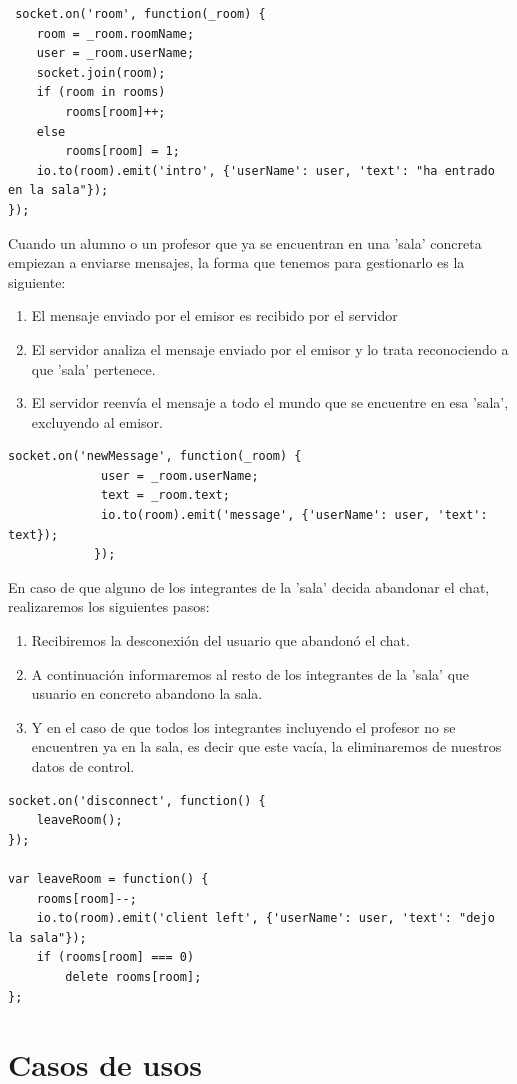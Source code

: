 \begin{itemize}
\begin{lstlisting}
 socket.on('room', function(_room) {
    room = _room.roomName;
	user = _room.userName;
    socket.join(room);
    if (room in rooms)
        rooms[room]++;
    else
        rooms[room] = 1;
    io.to(room).emit('intro', {'userName': user, 'text': "ha entrado en la sala"});
});

\end{lstlisting}

Cuando un alumno o un profesor que ya se encuentran en una 'sala' concreta empiezan a enviarse mensajes, la forma que tenemos para gestionarlo es la siguiente:

\begin{enumerate}
    \item El mensaje enviado por el emisor es recibido por el servidor

    \item El servidor analiza el mensaje enviado por el emisor y lo trata reconociendo a que 'sala' pertenece.

    \item El servidor reenvía el mensaje a todo el mundo que se encuentre en esa 'sala', excluyendo al emisor.
\end{enumerate}

\begin{lstlisting}
socket.on('newMessage', function(_room) {
			 user = _room.userName;
			 text = _room.text;
			 io.to(room).emit('message', {'userName': user, 'text': text});
			});
\end{lstlisting}

En caso de que alguno de los integrantes de la 'sala' decida abandonar el chat, realizaremos los siguientes pasos:

\begin{enumerate}
    \item Recibiremos la desconexión del usuario que abandonó el chat.

    \item A continuación informaremos al resto de los integrantes de la 'sala' que usuario en concreto abandono la sala.

    \item Y en el caso de que todos los integrantes incluyendo el profesor no se encuentren ya en la sala, es decir que este vacía, la eliminaremos de nuestros datos de control.

\end{enumerate}

\begin{lstlisting}
socket.on('disconnect', function() {
    leaveRoom();
});

var leaveRoom = function() {
    rooms[room]--;
    io.to(room).emit('client left', {'userName': user, 'text': "dejo la sala"});
    if (rooms[room] === 0)
        delete rooms[room];
};
\end{lstlisting}
\end{itemize}

\section{Casos de usos}
